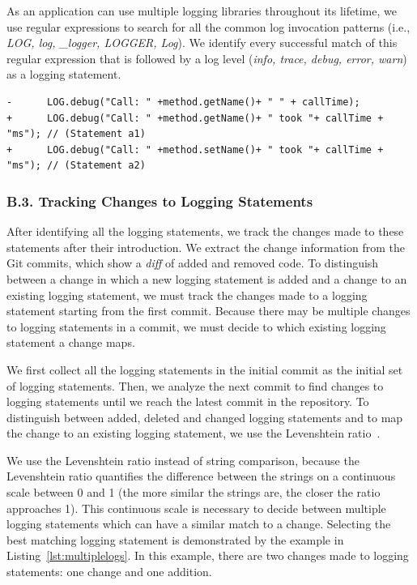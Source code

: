 As an application can use multiple logging libraries throughout its lifetime, we use regular expressions to search for all the common log invocation patterns (i.e., \emph{LOG, log, \_logger, LOGGER, Log}). We identify every successful match of this regular expression that is followed by a log level (\emph{info, trace, debug, error, warn}) as a logging statement.
\begin{lstlisting}[caption={Selecting the best matching logging statement}, label={lst:multiplelogs}, float=*]
-      LOG.debug("Call: " +method.getName()+ " " + callTime);
+      LOG.debug("Call: " +method.getName()+ " took "+ callTime + "ms"); // (Statement a1)
+      LOG.debug("Call: " +method.setName()+ " took "+ callTime + "ms"); // (Statement a2)

\end{lstlisting}

\subsubsection*{B.3. Tracking Changes to Logging Statements}
After identifying all the logging statements, we track the changes made to these statements after their introduction. We extract the change information from the Git commits, which show a \emph{diff} of added and removed code. To distinguish between a change in which a new logging statement is added and a change to an existing logging statement, we must track the changes made to a logging statement starting from the first commit. Because there may be multiple changes to logging statements in a commit, we must decide to which existing logging statement a change maps.

We first collect all the logging statements in the initial commit as the initial set of logging statements. Then, we analyze the next commit to find changes to logging statements until we reach the latest commit in the repository. To distinguish between added, deleted and changed logging statements and to map the change to an existing logging statement, we use the Levenshtein ratio~\cite{levenshteinratio}. 

We use the Levenshtein ratio instead of string comparison, because the Levenshtein ratio quantifies the difference between the strings on a continuous scale between 0 and 1 (the more similar the strings are, the closer the ratio approaches 1). This continuous scale is necessary to decide between multiple logging statements which can have a similar match to a change. Selecting the best matching logging statement is demonstrated by the example in Listing~\ref{lst:multiplelogs}. In this example, there are two changes made to logging statements: one change and one addition. 

